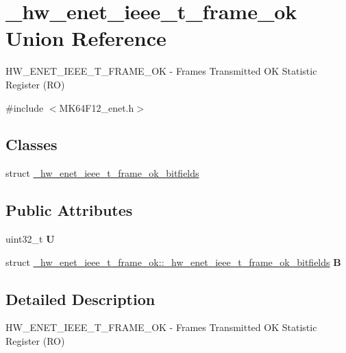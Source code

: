 \hypertarget{union__hw__enet__ieee__t__frame__ok}{}\section{\+\_\+hw\+\_\+enet\+\_\+ieee\+\_\+t\+\_\+frame\+\_\+ok Union Reference}
\label{union__hw__enet__ieee__t__frame__ok}


H\+W\+\_\+\+E\+N\+E\+T\+\_\+\+I\+E\+E\+E\+\_\+\+T\+\_\+\+F\+R\+A\+M\+E\+\_\+\+OK -\/ Frames Transmitted OK Statistic Register (RO)  




{\ttfamily \#include $<$M\+K64\+F12\+\_\+enet.\+h$>$}

\subsection*{Classes}
\begin{DoxyCompactItemize}
\item 
struct \hyperlink{struct__hw__enet__ieee__t__frame__ok_1_1__hw__enet__ieee__t__frame__ok__bitfields}{\+\_\+hw\+\_\+enet\+\_\+ieee\+\_\+t\+\_\+frame\+\_\+ok\+\_\+bitfields}
\end{DoxyCompactItemize}
\subsection*{Public Attributes}
\begin{DoxyCompactItemize}
\item 
uint32\+\_\+t {\bfseries U}\hypertarget{union__hw__enet__ieee__t__frame__ok_a6203983201defe1ab6e8b985b769618c}{}\label{union__hw__enet__ieee__t__frame__ok_a6203983201defe1ab6e8b985b769618c}

\item 
struct \hyperlink{struct__hw__enet__ieee__t__frame__ok_1_1__hw__enet__ieee__t__frame__ok__bitfields}{\+\_\+hw\+\_\+enet\+\_\+ieee\+\_\+t\+\_\+frame\+\_\+ok\+::\+\_\+hw\+\_\+enet\+\_\+ieee\+\_\+t\+\_\+frame\+\_\+ok\+\_\+bitfields} {\bfseries B}\hypertarget{union__hw__enet__ieee__t__frame__ok_a1408a1ca48cd71dd94476c43838b93ca}{}\label{union__hw__enet__ieee__t__frame__ok_a1408a1ca48cd71dd94476c43838b93ca}

\end{DoxyCompactItemize}


\subsection{Detailed Description}
H\+W\+\_\+\+E\+N\+E\+T\+\_\+\+I\+E\+E\+E\+\_\+\+T\+\_\+\+F\+R\+A\+M\+E\+\_\+\+OK -\/ Frames Transmitted OK Statistic Register (RO) 

